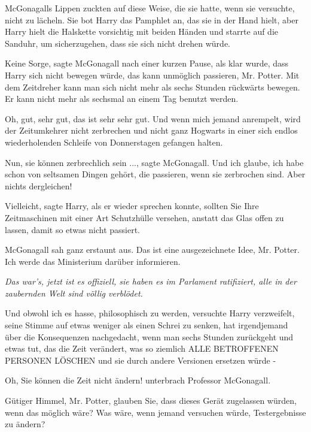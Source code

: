 McGonagalls Lippen zuckten auf diese Weise, die sie hatte, wenn sie versuchte,
nicht zu lächeln. Sie bot Harry das Pamphlet an, das sie in der Hand hielt, aber
Harry hielt die Halskette vorsichtig mit beiden Händen und starrte auf die
Sanduhr, um sicherzugehen, dass sie sich nicht drehen würde.

\glqq{}Keine Sorge\grqq{}, sagte McGonagall nach einer kurzen Pause, als klar
wurde, dass Harry sich nicht bewegen würde, \glqq{}das kann unmöglich passieren,
Mr. Potter. Mit dem Zeitdreher kann man sich nicht mehr als sechs Stunden
rückwärts bewegen. Er kann nicht mehr als sechsmal an einem Tag benutzt
werden.\grqq{}

\glqq{}Oh, gut, sehr gut, das ist sehr sehr gut. Und wenn mich jemand anrempelt,
wird der Zeitumkehrer nicht zerbrechen und nicht ganz Hogwarts in einer sich
endlos wiederholenden Schleife von Donnerstagen gefangen halten.\grqq{}

\glqq{}Nun, sie können zerbrechlich sein ...\grqq{}, sagte McGonagall. \glqq{}Und
ich glaube, ich habe schon von seltsamen Dingen gehört, die passieren, wenn sie
zerbrochen sind. Aber nichts dergleichen!\grqq{}

\glqq{}Vielleicht\grqq{}, sagte Harry, als er wieder sprechen konnte, \glqq{}
sollten Sie Ihre Zeitmaschinen mit einer Art Schutzhülle versehen, anstatt das
Glas offen zu lassen, damit so etwas nicht passiert.\grqq{}

McGonagall sah ganz erstaunt aus. \glqq{}Das ist eine ausgezeichnete Idee, Mr.
Potter. Ich werde das Ministerium darüber informieren.\grqq{}

\emph{Das war's, jetzt ist es offiziell, sie haben es im Parlament ratifiziert,
alle in der zaubernden Welt sind völlig verblödet.}

\glqq{}Und obwohl ich es hasse, philosophisch zu werden\grqq{}, versuchte Harry
verzweifelt, seine Stimme auf etwas weniger als einen Schrei zu senken, \glqq{}
hat irgendjemand über die Konsequenzen nachgedacht, wenn man sechs Stunden
zurückgeht und etwas tut, das die Zeit verändert, was so ziemlich ALLE
BETROFFENEN PERSONEN LÖSCHEN und sie durch andere Versionen ersetzen würde
-\grqq{}

\glqq{}Oh, Sie können die Zeit nicht ändern!\grqq{} unterbrach Professor
McGonagall.

\glqq{}Gütiger Himmel, Mr. Potter, glauben Sie, dass dieses Gerät zugelassen
würden, wenn das möglich wäre? Was wäre, wenn jemand versuchen würde,
Testergebnisse zu ändern?\grqq{}

